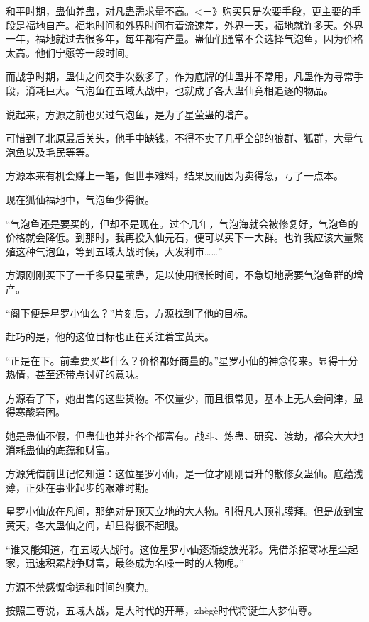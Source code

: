 
\begin{this_body}

和平时期，蛊仙养蛊，对凡蛊需求量不高。<－》购买只是次要手段，更主要的手段是福地自产。福地时间和外界时间有着流速差，外界一天，福地就许多天。外界一年，福地就过去很多年，每年都有产量。蛊仙们通常不会选择气泡鱼，因为价格太高。他们宁愿等一段时间。

而战争时期，蛊仙之间交手次数多了，作为底牌的仙蛊并不常用，凡蛊作为寻常手段，消耗巨大。气泡鱼在五域大战中，也就成了各大蛊仙竞相追逐的物品。

说起来，方源之前也买过气泡鱼，是为了星萤蛊的增产。

可惜到了北原最后关头，他手中缺钱，不得不卖了几乎全部的狼群、狐群，大量气泡鱼以及毛民等等。

方源本来有机会赚上一笔，但世事难料，结果反而因为卖得急，亏了一点本。

现在狐仙福地中，气泡鱼少得很。

“气泡鱼还是要买的，但却不是现在。过个几年，气泡海就会被修复好，气泡鱼的价格就会降低。到那时，我再投入仙元石，便可以买下一大群。也许我应该大量繁殖这种气泡鱼，等到五域大战时候，大发利市……”

方源刚刚买下了一千多只星萤蛊，足以使用很长时间，不急切地需要气泡鱼群的增产。

“阁下便是星罗小仙么？”片刻后，方源找到了他的目标。

赶巧的是，他的这位目标也正在关注着宝黄天。

“正是在下。前辈要买些什么？价格都好商量的。”星罗小仙的神念传来。显得十分热情，甚至还带点讨好的意味。

方源看了下，她出售的这些货物。不仅量少，而且很常见，基本上无人会问津，显得寒酸窘困。

她是蛊仙不假，但蛊仙也并非各个都富有。战斗、炼蛊、研究、渡劫，都会大大地消耗蛊仙的底蕴和财富。

方源凭借前世记忆知道：这位星罗小仙，是一位才刚刚晋升的散修女蛊仙。底蕴浅薄，正处在事业起步的艰难时期。

星罗小仙放在凡间，那绝对是顶天立地的大人物。引得凡人顶礼膜拜。但是放到宝黄天，各大蛊仙之间，却显得很不起眼。

“谁又能知道，在五域大战时。这位星罗小仙逐渐绽放光彩。凭借杀招寒冰星尘起家，迅速积累战争财富，最终成为名噪一时的人物呢。”

方源不禁感慨命运和时间的魔力。

按照三尊说，五域大战，是大时代的开幕，zhègè时代将诞生大梦仙尊。


\end{this_body}
